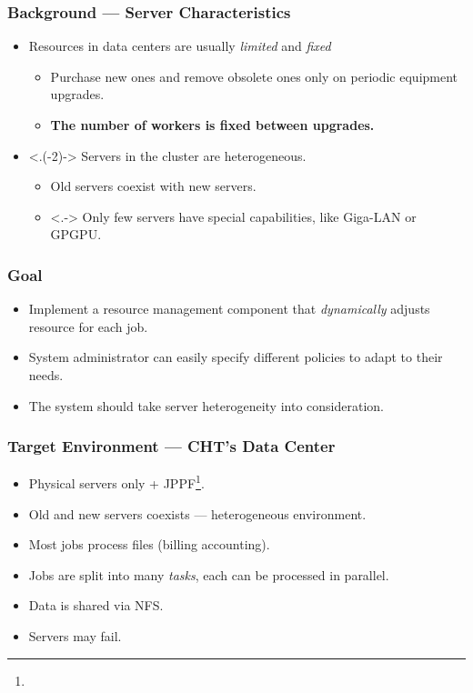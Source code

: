 \begin{frame}
  \frametitle{Background --- Server Characteristics}
  \begin{itemize}[<+->]
    \item Resources in data centers are usually \emph{limited} and
      \emph{fixed}
      \begin{itemize}
        \item Purchase new ones and remove obsolete ones only on
          periodic equipment upgrades.
        \item \textbf{The number of workers is fixed between upgrades.}
      \end{itemize}
    \item <.(-2)-> Servers in the cluster are \alert{heterogeneous}.
      \begin{itemize}
        \item Old servers coexist with new servers.
        \item <.-> Only few servers have special capabilities, like Giga-LAN
          or GPGPU.
      \end{itemize}
  \end{itemize}
\end{frame}
\begin{frame}
  \frametitle{Goal}
  \begin{itemize}
    \item Implement a resource management component that \emph{dynamically}
      adjusts resource for each job.
    \item System administrator can easily specify different policies to
      adapt to their needs.
    \item The system should take server \alert{heterogeneity} into consideration.
  \end{itemize}
\end{frame}
\begin{frame}
  \frametitle{Target Environment --- CHT's Data Center}
  \begin{itemize}
    \item Physical servers only +
      JPPF\footnote[frame]{\tiny{}}.
    \item Old and new servers coexists --- heterogeneous environment.
    \item Most jobs process files (billing accounting).
    \item Jobs are split into many \emph{tasks}, each can be processed
      in parallel.
    \item Data is shared via NFS.
    \item Servers may fail.
  \end{itemize}
\end{frame}

